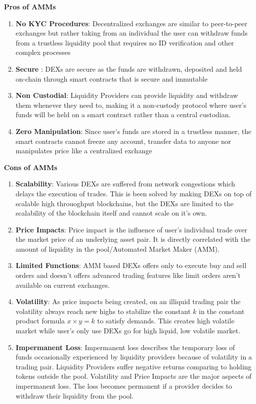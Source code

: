 \documentclass[conference]{IEEEtran}
\begin{document}
\textbf{Pros of AMMs}
\begin{enumerate}[wide, labelwidth=!, labelindent=0pt]
\item \textbf{No KYC Procedures}: Decentralized exchanges are similar to peer-to-peer exchanges but rather taking from an individual the user can withdraw funds from a trustless liquidity pool that requires no ID verification and other complex processes
\item \textbf{Secure} : DEXs are secure as the funds are withdrawn, deposited and held on-chain through smart contracts that is secure and immutable
\item \textbf{Non Custodial}: Liquidity Providers can provide liquidity and withdraw them whenever they need to, making it a non-custody protocol where user's funds will be held on a smart contract rather than a central custodian.
\item \textbf{Zero Manipulation}: Since user's funds are stored in a trustless manner, the smart contracts cannot freeze any account, transfer data to anyone nor manipulates price like a centralized exchange
\end{enumerate}

\textbf{Cons of AMMs}
\begin{enumerate}[wide, labelwidth=!, labelindent=0pt]
\item \textbf{Scalability}: Various DEXs are suffered from network congestions which delays the execution of trades. This is been solved by making DEXs on top of scalable high throuoghput blockchains, but the DEXs are limited to the scalability of the blockchain itself and cannot scale on it's own.
\item \textbf{Price Impacts}: Price impact is the influence of user's individual trade over the market price of an underlying asset pair. It is directly correlated with the amount of liquidity in the pool/Automated Market Maker (AMM).
\item \textbf{Limited Functions}: AMM based DEXs offers only to execute buy and sell orders and doesn't offers advanced trading features like limit orders aren't available on current exchanges.
\item \textbf{Volatility}: As price impacts being created, on an illiquid trading pair the volatility always reach new highs to stabilize the constant $k$ in the constant product formula $x \times  y=k$ to satisfy demands. This creates high volatile market while user's only use DEXs go for high liquid, low volatile market.
\item \textbf{Impermanent Loss}: Impermanent loss describes the temporary loss of funds occasionally experienced by liquidity providers because of volatility in a trading pair. Liquidity Providers suffer negative returns comparing to holding tokens outside the pool. Volatility and Price Impacts are the major aspects of impermanent loss. The loss becomes permanent if a provider decides to withdraw their liquidity from the pool.
\end{enumerate}
\end{document}
